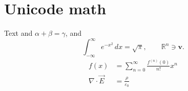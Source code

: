 \documentclass{article}
\begin{document}
\section{Unicode math}
Text and $\alpha + \beta = \gamma$, and
\[ \int_{-\infty}^{\infty} e^{-x^2}\,dx = \sqrt{\pi}, \qquad \mathbb{R}^n \ni \mathbf{v}. \]
\begin{align}
  f(x) &= \sum_{n=0}^\infty \frac{f^{(n)}(0)}{n!} x^n \\
  \nabla \cdot \vec{E} &= \frac{\rho}{\varepsilon_0}
\end{align}
\end{document}
